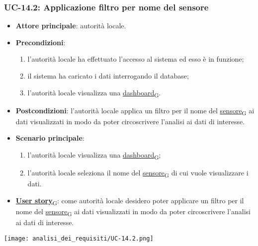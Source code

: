 \subsubsection{UC-14.2: Applicazione filtro per nome del sensore}
\begin{itemize}
	\item \textbf{Attore principale}: autorità locale.
	\item \textbf{Precondizioni}:
	      \begin{enumerate}
		      \item l'autorità locale ha effettuato l'accesso al sistema ed esso è in funzione;
		      \item il sistema ha caricato i dati interrogando il database;
		      \item l'autorità locale visualizza una \href{https://7last.github.io/docs/pb/documentazione-interna/glossario\#dashboard}{dashboard\textsubscript{G}}.
	      \end{enumerate}
	\item \textbf{Postcondizioni}: l'autorità locale applica un filtro per il nome del \href{https://7last.github.io/docs/pb/documentazione-interna/glossario\#sensore}{sensore\textsubscript{G}} ai dati visualizzati in modo da poter circoscrivere l'analisi ai dati di interesse.
	\item \textbf{Scenario principale}:
	      \begin{enumerate}
		      \item l'autorità locale visualizza una \href{https://7last.github.io/docs/pb/documentazione-interna/glossario\#dashboard}{dashboard\textsubscript{G}};
		      \item l'autorità locale seleziona il nome del \href{https://7last.github.io/docs/pb/documentazione-interna/glossario\#sensore}{sensore\textsubscript{G}} di cui vuole visualizzare i dati.
	      \end{enumerate}
	\item \href{https://7last.github.io/docs/pb/documentazione-interna/glossario\#user-story}{\textbf{User story}\textsubscript{G}}:
	      come autorità locale desidero poter applicare un filtro per il nome del \href{https://7last.github.io/docs/pb/documentazione-interna/glossario\#sensore}{sensore\textsubscript{G}} ai dati visualizzati in modo da poter circoscrivere l'analisi ai dati di interesse.
\end{itemize}
\begin{center}
	\texttt{[image: analisi\_dei\_requisiti/UC-14.2.png]}
\end{center}


